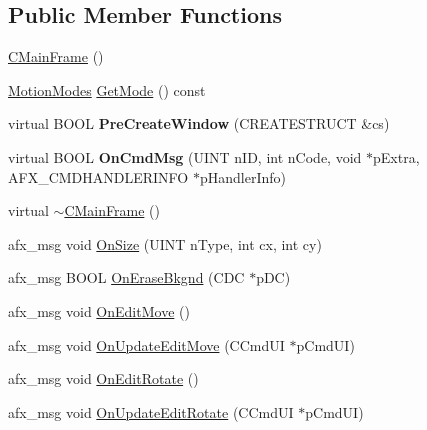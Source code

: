 \subsection*{Public Member Functions}
\begin{DoxyCompactItemize}
\item 
\hyperlink{class_c_main_frame_af3e997aeae4148d2aaa4a1e1ae7bdd53}{C\+Main\+Frame} ()
\item 
\hyperlink{class_c_main_frame_a89722c82d82f95a761772a8dd9755b7b}{Motion\+Modes} \hyperlink{class_c_main_frame_a76c571ab75752dba8049e08f5e4ac920}{Get\+Mode} () const 
\item 
\hypertarget{class_c_main_frame_a549bf677c955c2898c3c683321633c16}{}virtual B\+O\+O\+L {\bfseries Pre\+Create\+Window} (C\+R\+E\+A\+T\+E\+S\+T\+R\+U\+C\+T \&cs)\label{class_c_main_frame_a549bf677c955c2898c3c683321633c16}

\item 
\hypertarget{class_c_main_frame_ade959eb0bab719bf06bb9b18ee407101}{}virtual B\+O\+O\+L {\bfseries On\+Cmd\+Msg} (U\+I\+N\+T n\+I\+D, int n\+Code, void $\ast$p\+Extra, A\+F\+X\+\_\+\+C\+M\+D\+H\+A\+N\+D\+L\+E\+R\+I\+N\+F\+O $\ast$p\+Handler\+Info)\label{class_c_main_frame_ade959eb0bab719bf06bb9b18ee407101}

\item 
virtual \hyperlink{class_c_main_frame_a8ae555f23fdf97edb4feb4d3e1bfa4ee}{$\sim$\+C\+Main\+Frame} ()
\item 
afx\+\_\+msg void \hyperlink{class_c_main_frame_adf171bf1f2c6f10cc85dbe8db3fc93f7}{On\+Size} (U\+I\+N\+T n\+Type, int cx, int cy)
\item 
afx\+\_\+msg B\+O\+O\+L \hyperlink{class_c_main_frame_a53a97f2229c5765329b2b59a21a54b0d}{On\+Erase\+Bkgnd} (C\+D\+C $\ast$p\+D\+C)
\item 
afx\+\_\+msg void \hyperlink{class_c_main_frame_af07c2610f9f5631e7eb7374d10d5fdd3}{On\+Edit\+Move} ()
\item 
afx\+\_\+msg void \hyperlink{class_c_main_frame_aadc40c4ab290da2368f6b87443f5ffbc}{On\+Update\+Edit\+Move} (C\+Cmd\+U\+I $\ast$p\+Cmd\+U\+I)
\item 
afx\+\_\+msg void \hyperlink{class_c_main_frame_a00f10667f35de1fa6693c1bea941d878}{On\+Edit\+Rotate} ()
\item 
afx\+\_\+msg void \hyperlink{class_c_main_frame_af098b8129775d1b5fb47fcaaabce8c01}{On\+Update\+Edit\+Rotate} (C\+Cmd\+U\+I $\ast$p\+Cmd\+U\+I)
\end{DoxyCompactItemize}
